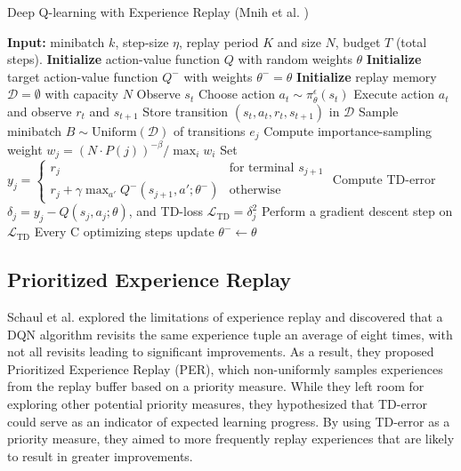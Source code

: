 \begin{algorithm}
\caption{Deep Q-learning with Experience Replay (Mnih et al. \cite{mnih2013playing, mnih2015human})}
\label{algorithm:dqn}
\begin{algorithmic}[1]
\State \textbf{Input:} minibatch $k$, step-size $\eta$, replay period $K$ and size $N$, budget $T$ (total steps).
\State \textbf{Initialize} action-value function $Q$ with random weights $\theta$
\State \textbf{Initialize} target action-value function $Q^-$ with weights $\theta^- = \theta$
\State \textbf{Initialize} replay memory $\mathcal{D} = \emptyset$ with capacity $N$ %
    \State Observe $s_t$
    \State Choose action $a_t \sim \pi^\epsilon_\theta(s_t)$
    \State Execute action $a_t$ and observe $r_t$ and $s_{t+1}$
    \State Store transition $(s_t, a_t, r_t, s_{t+1})$ in $\mathcal{D}$
        \State Sample minibatch $B \sim \text{Uniform}(\mathcal{D})$ of transitions $e_j$
        \State Compute importance-sampling weight $w_j = \left( N \cdot P(j) \right)^{-\beta} / \max_i w_i$
        \State Set $y_j = 
        \begin{cases} 
            r_j & \text{for terminal } s_{j+1}\\
            r_j + \gamma \max_{a'} Q^-(s_{j+1}, a'; \theta^-) & \text{otherwise}
        \end{cases}$
        \State Compute TD-error $\delta_j = y_j - Q(s_{j}, a_{j}; \theta)$, and TD-loss $\mathcal{L}_{\text{TD}} = \delta_j^2 $
        \State Perform a gradient descent step on $\mathcal{L}_{\text{TD}}$
        \State Every C optimizing steps update $\theta^- \leftarrow \theta$
\EndFor
\end{algorithmic}
\end{algorithm}

\subsection{Prioritized Experience Replay}
\label{sec:per}
Schaul et al. \cite{schaul2015prioritized} explored the limitations of experience replay and discovered that a DQN algorithm revisits the same experience tuple an average of eight times, with not all revisits leading to significant improvements. As a result, they proposed Prioritized Experience Replay (PER), which non-uniformly samples experiences from the replay buffer based on a priority measure. While they left room for exploring other potential priority measures, they hypothesized that TD-error could serve as an indicator of expected learning progress. By using TD-error as a priority measure, they aimed to more frequently replay experiences that are likely to result in greater improvements.

